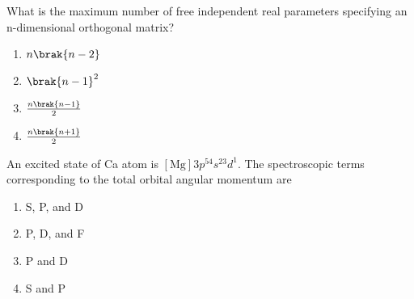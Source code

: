 \iffalse
\chapter{2022}
\author{EE24BTECH11004}
\section{ph}
\fi


    \item What is the maximum number of free independent real parameters specifying an n-dimensional orthogonal matrix?
    \begin{enumerate}
        \item $n\brak{n-2}$
        \item $\brak{n-1}^2$
        \item $\frac{n\brak{n-1}}{2}$
        \item $\frac{n\brak{n+1}}{2}$
    \end{enumerate}

    \item An excited state of Ca atom is $[\text{Mg}]3p^54s^23d^1$. The spectroscopic terms corresponding to the total orbital angular momentum are
    \begin{enumerate}
        \item S, P, and D
        \item P, D, and F
        \item P and D
        \item S and P
    \end{enumerate}

